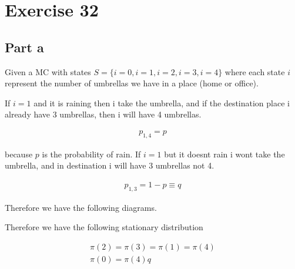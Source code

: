 \documentclass[12pt, a4paper]{article}
\begin{document}
\section{Exercise 32}
\subsection{Part a}
Given a MC with states $S = \{i = 0, i = 1, i = 2, i = 3, i = 4\}$ where each
state $i$ represent the number of umbrellas we have in a place (home or office).

If $i = 1$ and it is raining then i take the umbrella, and if the destination
place i already have 3 umbrellas, then i will have 4 umbrellas.

\begin{align*}
  p_{1,4} = p
\end{align*}

because $p$ is the probability of rain. If $i=1$ but it doesnt rain i wont take
the umbrella, and in destination i will have 3 umbrellas not 4.

\begin{align*}
  p_{1,3} = 1 - p \equiv q
\end{align*}

Therefore we have the following diagrams.


Therefore we have the following stationary distribution

\begin{align*}
  \pi(2) = \pi(3) = \pi(1) = \pi(4)\\
  \pi(0) = \pi(4)q
\end{align*}
\end{document}
